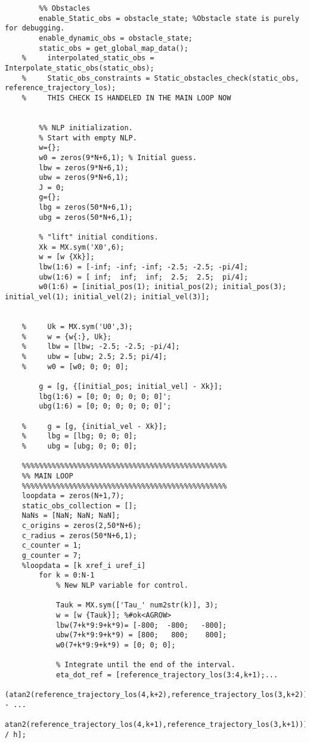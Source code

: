 \begin{lstlisting}
        %% Obstacles
        enable_Static_obs = obstacle_state; %Obstacle state is purely for debugging.
        enable_dynamic_obs = obstacle_state;
        static_obs = get_global_map_data();
    %     interpolated_static_obs = Interpolate_static_obs(static_obs);
    %     Static_obs_constraints = Static_obstacles_check(static_obs, reference_trajectory_los); 
    %     THIS CHECK IS HANDELED IN THE MAIN LOOP NOW
        
            
        %% NLP initialization.
        % Start with empty NLP.
        w={};
        w0 = zeros(9*N+6,1); % Initial guess.
        lbw = zeros(9*N+6,1);
        ubw = zeros(9*N+6,1);
        J = 0;
        g={};
        lbg = zeros(50*N+6,1);
        ubg = zeros(50*N+6,1);
        
        % "lift" initial conditions.
        Xk = MX.sym('X0',6);
        w = [w {Xk}];
        lbw(1:6) = [-inf; -inf; -inf; -2.5; -2.5; -pi/4];
        ubw(1:6) = [ inf;  inf;  inf;  2.5;  2.5;  pi/4];
        w0(1:6) = [initial_pos(1); initial_pos(2); initial_pos(3); initial_vel(1); initial_vel(2); initial_vel(3)];
    
    
    %     Uk = MX.sym('U0',3);
    %     w = {w{:}, Uk};
    %     lbw = [lbw; -2.5; -2.5; -pi/4];
    %     ubw = [ubw; 2.5; 2.5; pi/4];
    %     w0 = [w0; 0; 0; 0];
        
        g = [g, {[initial_pos; initial_vel] - Xk}];
        lbg(1:6) = [0; 0; 0; 0; 0; 0]';
        ubg(1:6) = [0; 0; 0; 0; 0; 0]';
        
    %     g = [g, {initial_vel - Xk}];
    %     lbg = [lbg; 0; 0; 0];
    %     ubg = [ubg; 0; 0; 0];
     
    %%%%%%%%%%%%%%%%%%%%%%%%%%%%%%%%%%%%%%%%%%%%%%%%
    %% MAIN LOOP
    %%%%%%%%%%%%%%%%%%%%%%%%%%%%%%%%%%%%%%%%%%%%%%%%
    loopdata = zeros(N+1,7);
    static_obs_collection = [];
    NaNs = [NaN; NaN; NaN];
    c_origins = zeros(2,50*N+6);
    c_radius = zeros(50*N+6,1);
    c_counter = 1;
    g_counter = 7;
    %loopdata = [k xref_i uref_i]
        for k = 0:N-1
            % New NLP variable for control.
            
            Tauk = MX.sym(['Tau_' num2str(k)], 3);
            w = [w {Tauk}]; %#ok<AGROW> 
            lbw(7+k*9:9+k*9)= [-800;  -800;   -800];
            ubw(7+k*9:9+k*9) = [800;   800;    800];
            w0(7+k*9:9+k*9) = [0; 0; 0];
            
            % Integrate until the end of the interval.
            eta_dot_ref = [reference_trajectory_los(3:4,k+1);...
                      (atan2(reference_trajectory_los(4,k+2),reference_trajectory_los(3,k+2)) - ...
                       atan2(reference_trajectory_los(4,k+1),reference_trajectory_los(3,k+1))) / h];
            

\end{lstlisting}
